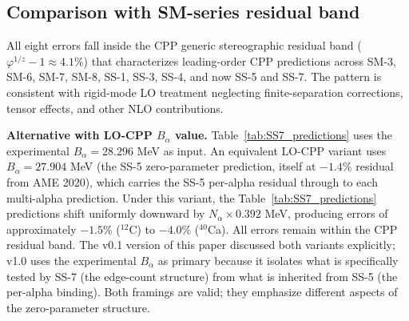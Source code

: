 \documentclass[11pt,letterpaper]{article}
\newcommand{\phig}{\varphi}
\newcommand{\Balpha}{B_{\alpha}}
\newcommand{\Nalpha}{N_{\alpha}}
\begin{document}
\subsection{Comparison with SM-series residual band}
\label{sec:residual_band}

All eight errors fall inside the CPP generic stereographic residual band ($\phig^{1/z} - 1 \approx 4.1\%$) that characterizes leading-order CPP predictions across SM-3, SM-6, SM-7, SM-8, SS-1, SS-3, SS-4, and now SS-5 and SS-7. The pattern is consistent with rigid-mode LO treatment neglecting finite-separation corrections, tensor effects, and other NLO contributions.

\textbf{Alternative with LO-CPP $\Balpha$ value.} Table~\ref{tab:SS7_predictions} uses the experimental $\Balpha = 28.296$ MeV as input. An equivalent LO-CPP variant uses $\Balpha = 27.904$ MeV (the SS-5 zero-parameter prediction, itself at $-1.4\%$ residual from AME 2020), which carries the SS-5 per-alpha residual through to each multi-alpha prediction. Under this variant, the Table~\ref{tab:SS7_predictions} predictions shift uniformly downward by $\Nalpha \times 0.392$ MeV, producing errors of approximately $-1.5\%$ (${}^{12}$C) to $-4.0\%$ (${}^{40}$Ca). All errors remain within the CPP residual band. The v0.1 version of this paper discussed both variants explicitly; v1.0 uses the experimental $\Balpha$ as primary because it isolates what is specifically tested by SS-7 (the edge-count structure) from what is inherited from SS-5 (the per-alpha binding). Both framings are valid; they emphasize different aspects of the zero-parameter structure.
\end{document}

